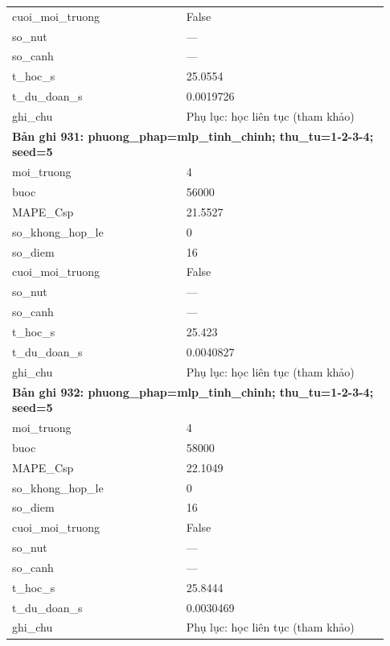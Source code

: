 \begin{longtable}{p{0.43\linewidth}p{0.50\linewidth}}
cuoi\_\allowbreak moi\_\allowbreak truong & False \\
so\_\allowbreak nut & — \\
so\_\allowbreak canh & — \\
t\_\allowbreak hoc\_\allowbreak s & 25.0554 \\
t\_\allowbreak du\_\allowbreak doan\_\allowbreak s & 0.0019726 \\
ghi\_\allowbreak chu & Phụ lục: học liên tục (tham khảo) \\
\midrule
\multicolumn{2}{p{0.95\linewidth}}{\textbf{Bản ghi 931: phuong\_phap=mlp\_tinh\_chinh; thu\_tu=1-2-3-4; seed=5}} \\
moi\_\allowbreak truong & 4 \\
buoc & 56000 \\
MAPE\_\allowbreak Csp & 21.5527 \\
so\_\allowbreak khong\_\allowbreak hop\_\allowbreak le & 0 \\
so\_\allowbreak diem & 16 \\
cuoi\_\allowbreak moi\_\allowbreak truong & False \\
so\_\allowbreak nut & — \\
so\_\allowbreak canh & — \\
t\_\allowbreak hoc\_\allowbreak s & 25.423 \\
t\_\allowbreak du\_\allowbreak doan\_\allowbreak s & 0.0040827 \\
ghi\_\allowbreak chu & Phụ lục: học liên tục (tham khảo) \\
\midrule
\multicolumn{2}{p{0.95\linewidth}}{\textbf{Bản ghi 932: phuong\_phap=mlp\_tinh\_chinh; thu\_tu=1-2-3-4; seed=5}} \\
moi\_\allowbreak truong & 4 \\
buoc & 58000 \\
MAPE\_\allowbreak Csp & 22.1049 \\
so\_\allowbreak khong\_\allowbreak hop\_\allowbreak le & 0 \\
so\_\allowbreak diem & 16 \\
cuoi\_\allowbreak moi\_\allowbreak truong & False \\
so\_\allowbreak nut & — \\
so\_\allowbreak canh & — \\
t\_\allowbreak hoc\_\allowbreak s & 25.8444 \\
t\_\allowbreak du\_\allowbreak doan\_\allowbreak s & 0.0030469 \\
ghi\_\allowbreak chu & Phụ lục: học liên tục (tham khảo) \\

\end{longtable}
